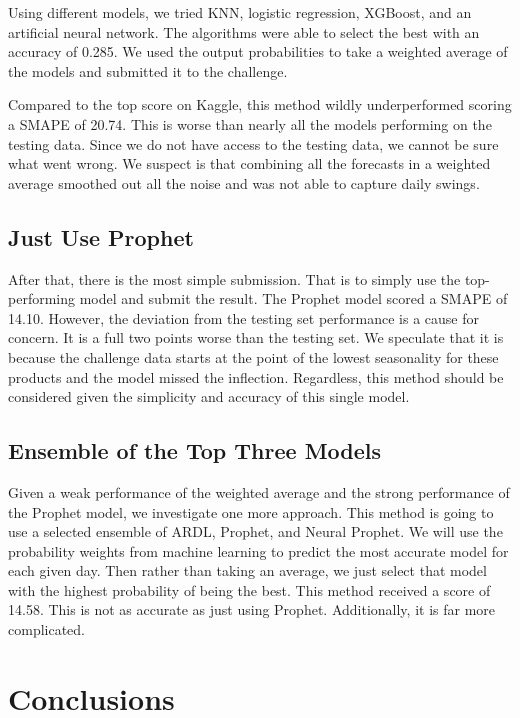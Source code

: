 \documentclass[16pt,twocolumn,letterpaper,titlepage]{article}
\begin{document}
Using different models, we tried KNN, logistic regression, XGBoost, and an artificial neural network. The algorithms were able to select the best with an accuracy of 0.285. We used the output probabilities to take a weighted average of the models and submitted it to the challenge.

Compared to the top score on Kaggle, this method wildly underperformed scoring a SMAPE of 20.74. This is worse than nearly all the models performing on the testing data. Since we do not have access to the testing data, we cannot be sure what went wrong. We suspect is that combining all the forecasts in a weighted average smoothed out all the noise and was not able to capture daily swings.


\subsection{Just Use Prophet}

After that, there is the most simple submission. That is to simply use the top-performing model and submit the result. The Prophet model scored a SMAPE of 14.10. However, the deviation from the testing set performance is a cause for concern. It is a full two points worse than the testing set. We speculate that it is because the challenge data starts at the point of the lowest seasonality for these products and the model missed the inflection. Regardless, this method should be considered given the simplicity and accuracy of this single model. 

\subsection{Ensemble of the Top Three Models}

Given a weak performance of the weighted average and the strong performance of the Prophet model, we investigate one more approach. This method is going to use a selected ensemble of ARDL, Prophet, and Neural Prophet. We will use the probability weights from machine learning to predict the most accurate model for each given day. Then rather than taking an average, we just select that model with the highest probability of being the best. This method received a score of 14.58. This is not as accurate as just using Prophet. Additionally, it is far more complicated. 


\section{Conclusions}
\end{document}

